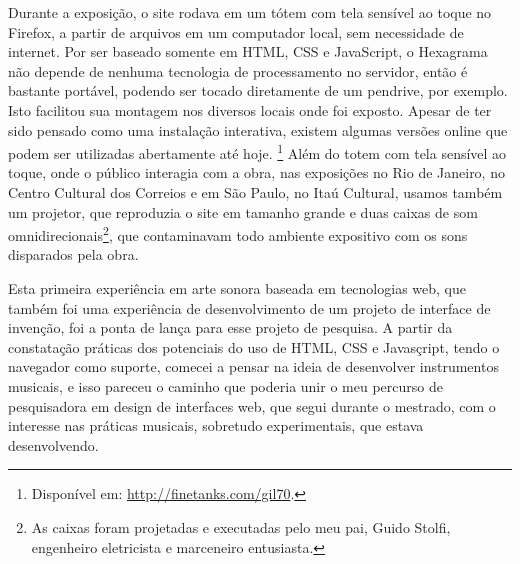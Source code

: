 Durante a exposição, o site rodava em um tótem com tela sensível ao toque no Firefox, a partir de arquivos em um computador local, sem necessidade de internet. Por ser baseado somente em HTML, CSS e JavaScript, o Hexagrama não depende de nenhuma tecnologia de processamento no servidor, então é bastante portável, podendo ser tocado diretamente de um pendrive, por exemplo. Isto facilitou sua montagem nos diversos locais onde foi exposto. Apesar de ter sido pensado como uma instalação interativa, existem algumas versões online que podem ser utilizadas abertamente até hoje. \footnote{Disponível em: \url{http://finetanks.com/gil70}.}
Além do totem com tela sensível ao toque, onde o público interagia com a obra, nas exposições no Rio de Janeiro, no Centro Cultural dos Correios e em São Paulo, no Itaú Cultural, usamos também um projetor, que reproduzia o site em tamanho grande e duas caixas de som omnidirecionais\footnote{As caixas foram projetadas e executadas pelo meu pai, Guido Stolfi, engenheiro eletricista e marceneiro entusiasta.}, que contaminavam todo ambiente expositivo com os sons disparados pela obra.

Esta primeira experiência em arte sonora baseada em tecnologias web, que também foi uma experiência de desenvolvimento de um projeto de interface de invenção, foi a ponta de lança para esse projeto de pesquisa. A partir da constatação práticas dos potenciais do uso de HTML, CSS e Javasçript, tendo o navegador como suporte, comecei a pensar na ideia de desenvolver instrumentos musicais, e isso pareceu o caminho que poderia unir o meu percurso de pesquisadora em design de interfaces web, que segui durante o mestrado, com o interesse nas práticas musicais, sobretudo experimentais, que estava desenvolvendo.


\newpage